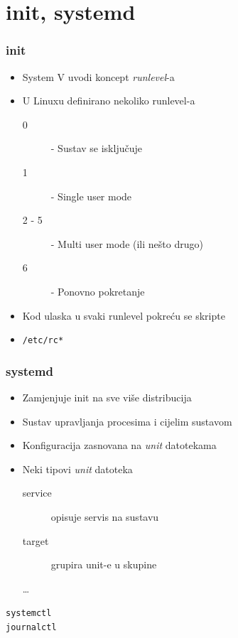 \documentclass[t]{beamer}
\begin{document}
\section{init, systemd}
\begin{frame}
	\frametitle{init}
	\begin{itemize}
		\item System V uvodi koncept \emph{runlevel}-a
	\end{itemize}
	\begin{itemize}
		\item U Linuxu definirano nekoliko runlevel-a
		\begin{description}
			\item[0] - Sustav se isključuje
			\item[1] - Single user mode
			\item[2 - 5] - Multi user mode (ili nešto drugo)
			\item[6] - Ponovno pokretanje
		\end{description}
		\item Kod ulaska u svaki runlevel pokreću se skripte
		\item[] \texttt{/etc/rc*}
	\end{itemize}
\end{frame}

\begin{frame}
	\frametitle{systemd}
	\begin{itemize}
		\item Zamjenjuje init na sve više distribucija
		\item Sustav upravljanja procesima i cijelim sustavom
	\end{itemize}
	\begin{itemize}
		\item Konfiguracija zasnovana na \emph{unit} datotekama
		\item Neki tipovi \emph{unit} datoteka
		\begin{description}
			\item[service] opisuje servis na sustavu
			\item[target] grupira unit-e u skupine
			\item[\dots]
		\end{description}
	\end{itemize}
	\vfill
	\texttt{systemctl} \\ \texttt{journalctl}
\end{frame}
\end{document}
